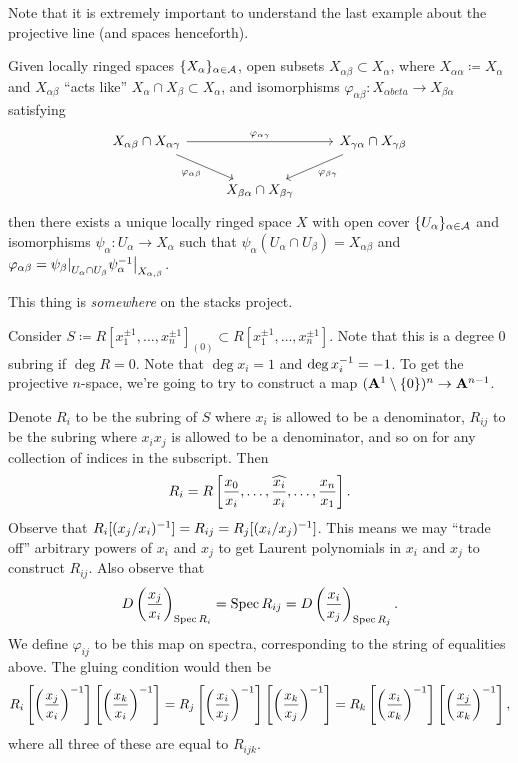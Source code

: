 Note that it is extremely important to understand the last example about the projective line (and spaces henceforth).

\newpage
\begin{theorem} \label{thm:compatible_locally_ringed_spaces}
    Given locally ringed spaces $\{X_\alpha\}_{\alpha \in \mathcal A}$, open subsets $X_{\alpha \beta} \subset X_\alpha$, where $X_{\alpha \alpha} \coloneq X_\alpha$ and $X_{\alpha \beta}$ ``acts like'' $X_\alpha \cap X_\beta \subset X_\alpha$, and isomorphisms $\varphi_{\alpha \beta} \colon X_{\alpha beta} \to X_{\beta \alpha}$ satisfying
    \[ 
        \begin{tikzcd}
            X_{\alpha \beta} \cap X_{\alpha \gamma} \arrow[rr, "\varphi_{\alpha \gamma}"] \arrow[dr, "\varphi_{\alpha \beta}"'] & & X_{\gamma \alpha} \cap X_{\gamma \beta} \arrow[dl, "\varphi_{\beta \gamma}"] \\
            & X_{\beta \alpha} \cap X_{\beta \gamma}
        \end{tikzcd}
    \]
    then there exists a unique locally ringed space $X$ with open cover $\{U_\alpha\}_{\alpha \in \mathcal A}$ and isomorphisms $\psi_\alpha \colon U_\alpha \to X_\alpha$ such that $\psi_\alpha(U_\alpha \cap U_\beta) = X_{\alpha \beta}$ and $\varphi_{\alpha \beta} = \restr{\psi_\beta}{U_\alpha \cap U_\beta} \restr{\psi_\alpha\inv}{X_{\alpha, \beta}}$.
\end{theorem}

{\color{amethyst} This thing is \textit{somewhere} on the stacks project.}

\begin{definition} \label{defn:projective_n-space}
    Consider $S \coloneq R[x_1^{\pm 1}, \dots, x_n^{\pm 1}]_{(0)} \subset R[x_1^{\pm 1}, \dots, x_n^{\pm 1}]$. Note that this is a degree $0$ subring if $\deg R = 0$. Note that $\deg x_i = 1$ and $\deg x_i^{-1} = -1$. To get the projective $n$-space, we're going to try to construct a map $(\mathbf A^1 \setminus \{0\})^n \to \mathbf A^{n-1}$.

    Denote $R_i$ to be the subring of $S$ where $x_i$ is allowed to be a denominator, $R_{ij}$ to be the subring where $x_i x_j$ is allowed to be a denominator, and so on for any collection of indices in the subscript. Then
    \[ R_i = R \left[\frac{x_0}{x_i}, \dots, \widehat{\frac{x_i}{x_i}}, \dots, \frac{x_n}{x_1}\right]. \]
    Observe that $R_i[(x_j / x_i)^{-1}] = R_{ij} = R_j[(x_i/x_j)^{-1}]$. This means we may ``trade off'' arbitrary powers of $x_i$ and $x_j$ to get Laurent polynomials in $x_i$ and $x_j$ to construct $R_{ij}$. Also observe that
    \[ D\left(\frac{x_j}{x_i}\right)_{\operatorname{Spec} R_i} = \operatorname{Spec} R_{ij} = D\left(\frac{x_i}{x_j}\right)_{\operatorname{Spec} R_j}. \]
    We define $\varphi_{ij}$ to be this map on spectra, corresponding to the string of equalities above. The gluing condition would then be
    \[ R_i \left[\left(\frac{x_j}{x_i}\right)^{-1}\right] \left[\left(\frac{x_k}{x_i}\right)^{-1}\right] = R_j \left[\left(\frac{x_i}{x_j}\right)^{-1}\right] \left[\left(\frac{x_k}{x_j}\right)^{-1}\right] = R_k \left[\left(\frac{x_i}{x_k}\right)^{-1}\right] \left[\left(\frac{x_j}{x_k}\right)^{-1}\right], \]
    where all three of these are equal to $R_{ijk}$.
\end{definition}

